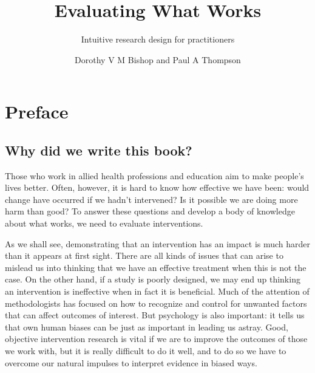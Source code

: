 \documentclass{krantz}
\title{Evaluating What Works}
\subtitle{Intuitive research design for practitioners}
\author{Dorothy V M Bishop and Paul A Thompson}
\begin{document}
\setcounter{page}{1}
\frontmatter
\maketitle
\setcounter{page}{1} %

\tableofcontents





%
%




\chapter*{Preface}\label{preface}


\hypertarget{why-did-we-write-this-book}{%
\section*{Why did we write this book?}\label{why-did-we-write-this-book}}


Those who work in allied health professions and education aim to make people's lives better. Often, however, it is hard to know how effective we have been: would change have occurred if we hadn't intervened? Is it possible we are doing more harm than good? To answer these questions and develop a body of knowledge about what works, we need to evaluate interventions.

As we shall see, demonstrating that an intervention has an impact is much harder than it appears at first sight. There are all kinds of issues that can arise to mislead us into thinking that we have an effective treatment when this is not the case. On the other hand, if a study is poorly designed, we may end up thinking an intervention is ineffective when in fact it is beneficial. Much of the attention of methodologists has focused on how to recognize and control for unwanted factors that can affect outcomes of interest. But psychology is also important: it tells us that own human biases can be just as important in leading us astray. Good, objective intervention research is vital if we are to improve the outcomes of those we work with, but it is really difficult to do it well, and to do so we have to overcome our natural impulses to interpret evidence in biased ways.
\end{document}
